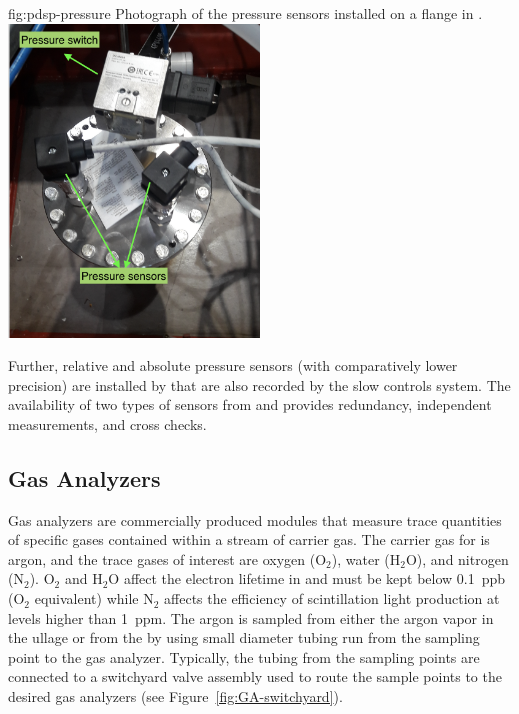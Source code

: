 \begin{dunefigure}{fig:pdsp-pressure}
  {Photograph of the pressure sensors installed on a flange in .}
  \includegraphics[width=0.5\textwidth]{graphics/cisc-pdsp-pressure-meters}
\end{dunefigure}

Further, relative and absolute pressure sensors (with comparatively lower precision) are installed by  that are also recorded by the slow controls system. The availability of two types of sensors from  and  provides redundancy, independent measurements, and cross checks.

\subsection{Gas Analyzers}
\label{sec:fdgen-slow-cryo-gas-anlyz}

 Gas analyzers are commercially produced modules that measure trace quantities of specific gases contained within a stream of carrier gas. The carrier gas for  is argon, and the trace gases of interest are oxygen ($\text{O}_2$), water ($\text{H}_2\text{O}$), and nitrogen ($\text{N}_2$). $\text{O}_2$ and $\text{H}_2\text{O}$ affect the electron lifetime in  and must be kept below \SI{0.1}{ppb} ($\text{O}_2$ equivalent) while $\text{N}_2$ affects the efficiency of scintillation light production at levels higher than \SI{1}{ppm}.
The argon is sampled from either the argon vapor in the ullage or from the  by using small diameter tubing run from the sampling point to the gas analyzer. Typically, the tubing from the sampling points are connected to a switchyard valve assembly used to route the sample points to the desired gas analyzers (see Figure~\ref{fig:GA-switchyard}).


